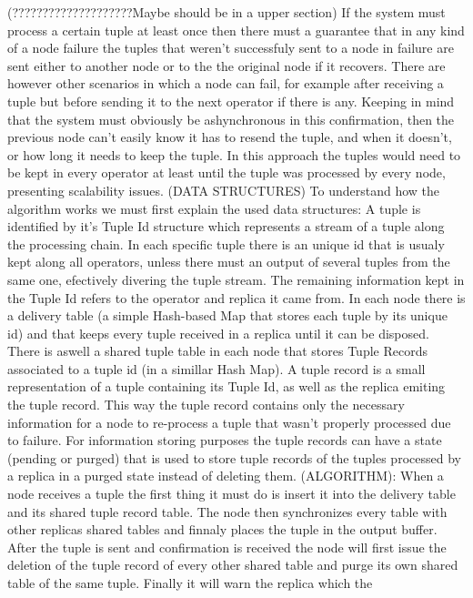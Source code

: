 \documentclass[times, 10pt,twocolumn]{article}
\begin{document}
(????????????????????Maybe should be in a upper section) If the system
must process a certain tuple at least once then there must a guarantee
that in any kind of a node failure the tuples that weren't successfuly
sent to a node in failure are sent either to another node or to the the
original node if it recovers. There are however other scenarios in which a
node can fail, for example after receiving a tuple but before sending it
to the next operator if there is any. Keeping in mind that the system must
obviously be ashynchronous in this confirmation, then the previous node
can't easily know it has to resend the tuple, and when it doesn't, or how
long it needs to keep the tuple.  In this approach the tuples would need
to be kept in every operator at least until the tuple was processed by
every node, presenting scalability issues.  (DATA STRUCTURES) To understand how the
algorithm works we must first explain the used data structures: A tuple is
identified by it's Tuple Id structure which represents a stream of a tuple
along the processing chain. In each specific tuple there is an unique id
that is usualy kept along all operators, unless there must an output of
several tuples from the same one, efectively divering the tuple stream.
The remaining information kept in the Tuple Id refers to the operator and
replica it came from. In each node there is a delivery table (a simple
Hash-based Map that stores each tuple by its unique id) and that keeps
every tuple received in a replica until it can be disposed.  There is
aswell a shared tuple table in each node that stores Tuple Records
associated to a tuple id (in a simillar Hash Map). A tuple record is a
small representation of a tuple containing its Tuple Id, as well as the
replica emiting the tuple record. This way the tuple record contains only
the necessary information for a node to re-process a tuple that wasn't
properly processed due to failure. For information storing purposes the
tuple records can have a state (pending or purged) that is used to store
tuple records of the tuples processed by a replica in a purged state
instead of deleting them. (ALGORITHM): When a node receives a tuple the first
thing it must do is insert it into the delivery table and its shared tuple
record table.  The node then synchronizes every table with other replicas
shared tables and finnaly places the tuple in the output buffer. After the
tuple is sent and confirmation is received the node will first issue the
deletion of the tuple record of every other shared table and purge its own
shared table of the same tuple. Finally it will warn the replica which the
\end{document}
